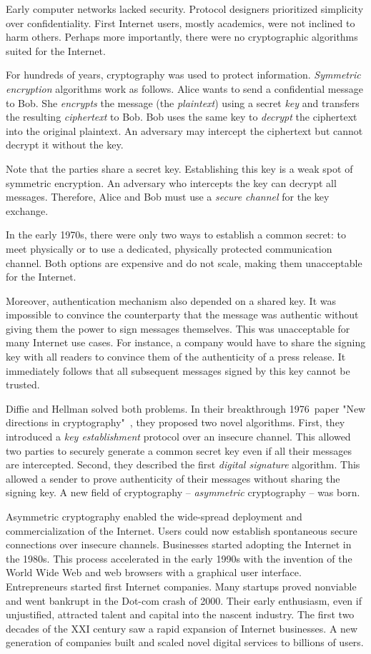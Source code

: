 Early computer networks lacked security.
Protocol designers prioritized simplicity over confidentiality.
First Internet users, mostly academics, were not inclined to harm others.
Perhaps more importantly, there were no cryptographic algorithms suited for the Internet.

For hundreds of years, cryptography was used to protect information.
\textit{Symmetric encryption} algorithms work as follows.
Alice wants to send a confidential message to Bob.
She \textit{encrypts} the message (the \textit{plaintext}) using a secret \textit{key} and transfers the resulting \textit{ciphertext} to Bob.
Bob uses the same key to \textit{decrypt} the ciphertext into the original plaintext.
An adversary may intercept the ciphertext but cannot decrypt it without the key.

Note that the parties share a secret key.
Establishing this key is a weak spot of symmetric encryption.
An adversary who intercepts the key can decrypt all messages.
Therefore, Alice and Bob must use a \textit{secure channel} for the key exchange.

In the early 1970s, there were only two ways to establish a common secret: to meet physically or to use a dedicated, physically protected communication channel.
Both options are expensive and do not scale, making them unacceptable for the Internet.

Moreover, authentication mechanism also depended on a shared key.
It was impossible to convince the counterparty that the message was authentic without giving them the power to sign messages themselves.
This was unacceptable for many Internet use cases.
For instance, a company would have to share the signing key with all readers to convince them of the authenticity of a press release.
It immediately follows that all subsequent messages signed by this key cannot be trusted.

Diffie and Hellman solved both problems.
In their breakthrough 1976~paper "New directions in cryptography"~\cite{Diffie1976}, they proposed two novel algorithms.
First, they introduced a \textit{key establishment} protocol over an insecure channel.
This allowed two parties to securely generate a common secret key even if all their messages are intercepted.
Second, they described the first \textit{digital signature} algorithm.
This allowed a sender to prove authenticity of their messages without sharing the signing key.
A new field of cryptography -- \textit{asymmetric} cryptography -- was born.

Asymmetric cryptography enabled the wide-spread deployment and commercialization of the Internet.
Users could now establish spontaneous secure connections over insecure channels.
Businesses started adopting the Internet in the 1980s.
This process accelerated in the early 1990s with the invention of the World Wide Web and web browsers with a graphical user interface.
Entrepreneurs started first Internet companies.
Many startups proved nonviable and went bankrupt in the Dot-com crash of 2000.
Their early enthusiasm, even if unjustified, attracted talent and capital into the nascent industry.
The first two decades of the XXI century saw a rapid expansion of Internet businesses.
A new generation of companies built and scaled novel digital services to billions of users.


